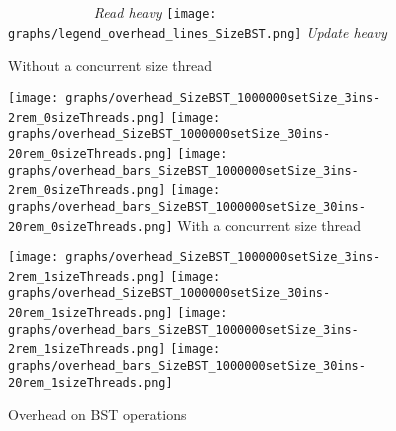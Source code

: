 \documentclass{article}
\begin{document}
\begin{figure*}[ht]
  \caption{Overhead on BST operations}
  \centering
  \medskip
  \textit{\ \ \ \ \ \ \ \ \ \ \ \ Read heavy}\hfill
  \texttt{[image: graphs/legend\_overhead\_lines\_SizeBST.png]}\hfill
  \textit{Update heavy\ \ \ \ }\par
  \medskip
  Without a concurrent size thread\par
  \hspace*{2mm}\texttt{[image: graphs/overhead\_SizeBST\_1000000setSize\_3ins-2rem\_0sizeThreads.png]}\hspace*{3mm}
  \texttt{[image: graphs/overhead\_SizeBST\_1000000setSize\_30ins-20rem\_0sizeThreads.png]}
  \texttt{[image: graphs/overhead\_bars\_SizeBST\_1000000setSize\_3ins-2rem\_0sizeThreads.png]}\hspace*{0.01mm}
  \texttt{[image: graphs/overhead\_bars\_SizeBST\_1000000setSize\_30ins-20rem\_0sizeThreads.png]}
  \medskip
  With a concurrent size thread\par
  \hspace*{2mm}\texttt{[image: graphs/overhead\_SizeBST\_1000000setSize\_3ins-2rem\_1sizeThreads.png]}\hspace*{3mm}
  \texttt{[image: graphs/overhead\_SizeBST\_1000000setSize\_30ins-20rem\_1sizeThreads.png]}
  {\texttt{[image: graphs/overhead\_bars\_SizeBST\_1000000setSize\_3ins-2rem\_1sizeThreads.png]}}\hspace*{0.01mm}
  \texttt{[image: graphs/overhead\_bars\_SizeBST\_1000000setSize\_30ins-20rem\_1sizeThreads.png]}
  \label{fig:BST overhead}
\end{figure*}
\end{document}
